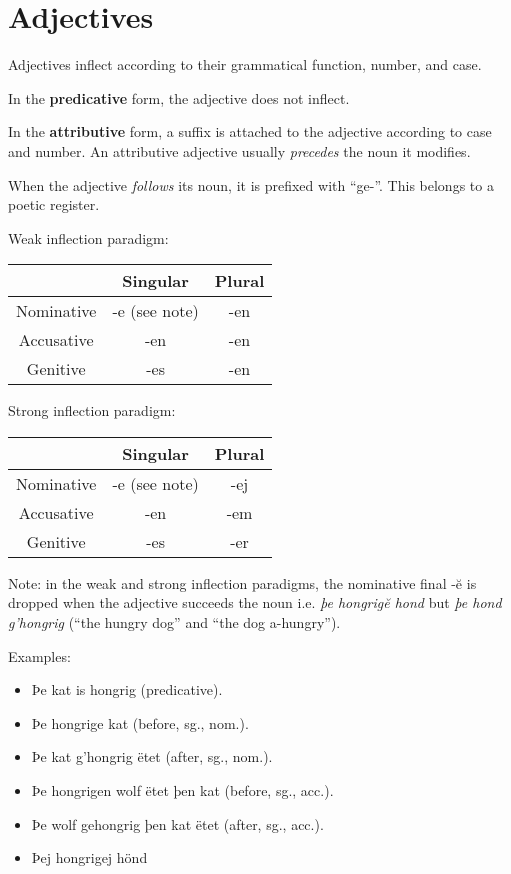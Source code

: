 \section{Adjectives}

Adjectives inflect according to their grammatical function, number, and case.

In the \textbf{predicative} form, the adjective does not inflect.

In the \textbf{attributive} form, a suffix is attached to the adjective
according to case and number. An attributive adjective usually \textit{precedes} the
noun it modifies.

When the adjective \textit{follows} its noun, it is prefixed with ``ge-''. This belongs to a poetic register.

Weak inflection paradigm:

\begin{center}
\begin{tabular}{|c|cc|}
\hline
& Singular & Plural \\
\hline
Nominative & -e (see note)  & -en \\
Accusative & -en & -en \\
Genitive   & -es & -en \\
\hline
\end{tabular}
\end{center}

Strong inflection paradigm:

\begin{center}
\begin{tabular}{|c|cc|}
\hline
& Singular & Plural \\
\hline
Nominative & -e (see note)  & -ej \\
Accusative & -en & -em \\
Genitive   & -es & -er \\
\hline
\end{tabular}
\end{center}

Note: in the weak and strong inflection paradigms, the nominative final -ĕ is dropped when the adjective succeeds the noun i.e. \textit{þe hongrigĕ hond} but \textit{þe hond g'hongrig} (``the hungry dog'' and ``the dog a-hungry'').

Examples:

\begin{itemize}
\item Þe kat is hongrig (predicative).
\item Þe hongrige kat (before, sg., nom.).
\item Þe kat g'hongrig ëtet (after, sg., nom.).
\item Þe hongrigen wolf ëtet þen kat (before, sg., acc.).
\item Þe wolf gehongrig þen kat ëtet (after, sg., acc.).
\item Þej hongrigej hönd
\end{itemize}

